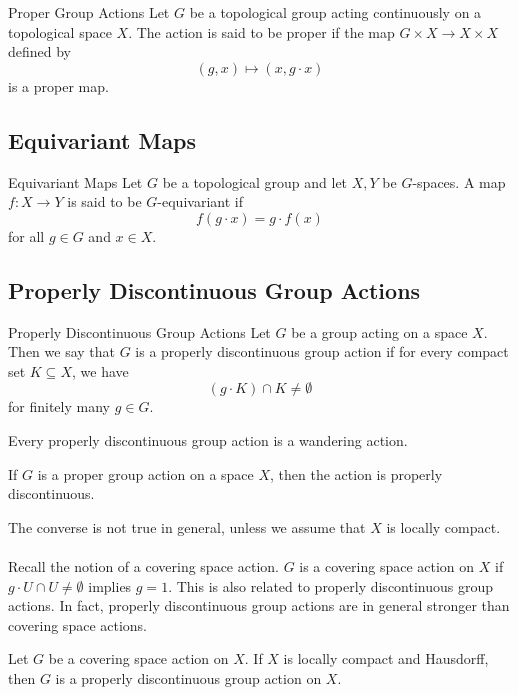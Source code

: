 \documentclass[a4paper]{article}
\begin{document}
\begin{defn}{Proper Group Actions}{} Let $G$ be a topological group acting continuously on a topological space $X$. The action is said to be proper if the map $G\times X\to X\times X$ defined by $$(g,x)\mapsto(x,g\cdot x)$$ is a proper map. 
\end{defn}

\subsection{Equivariant Maps}
\begin{defn}{Equivariant Maps}{} Let $G$ be a topological group and let $X,Y$ be $G$-spaces. A map $f:X\to Y$ is said to be $G$-equivariant if $$f(g\cdot x)=g\cdot f(x)$$ for all $g\in G$ and $x\in X$. 
\end{defn}

\subsection{Properly Discontinuous Group Actions}
\begin{defn}{Properly Discontinuous Group Actions}{} Let $G$ be a group acting on a space $X$. Then we say that $G$ is a properly discontinuous group action if for every compact set $K\subseteq X$, we have $$(g\cdot K)\cap K\neq\emptyset$$ for finitely many $g\in G$. 
\end{defn}

\begin{prp}{}{} Every properly discontinuous group action is a wandering action. 
\end{prp}

\begin{prp}{}{} If $G$ is a proper group action on a space $X$, then the action is properly discontinuous. 
\end{prp}

The converse is not true in general, unless we assume that $X$ is locally compact. \\~\\

Recall the notion of a covering space action. $G$ is a covering space action on $X$ if $g\cdot U\cap U\neq\emptyset$ implies $g=1$. This is also related to properly discontinuous group actions. In fact, properly discontinuous group actions are in general stronger than covering space actions. 

\begin{prp}{}{} Let $G$ be a covering space action on $X$. If $X$ is locally compact and Hausdorff, then $G$ is a properly discontinuous group action on $X$. 
\end{prp}
\end{document}
